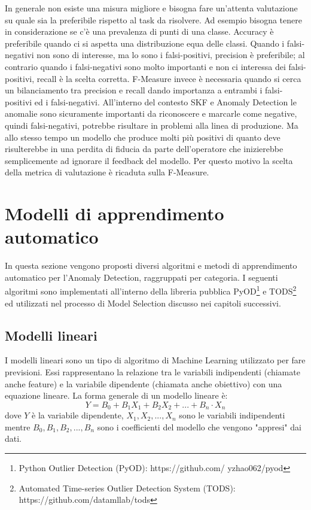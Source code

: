 In generale non esiste una misura migliore e bisogna fare un'attenta valutazione su quale sia la preferibile rispetto al task da risolvere.
Ad esempio bisogna tenere in considerazione se c'è una prevalenza di punti di una classe. Accuracy è preferibile quando ci si aspetta una distribuzione equa delle classi. Quando i falsi-negativi non sono di interesse, ma lo sono i falsi-positivi, precision è preferibile; al contrario quando i falsi-negativi sono molto importanti e non ci interessa dei falsi-positivi, recall è la scelta corretta.
F-Measure invece è necessaria quando si cerca un bilanciamento tra precision e recall dando importanza a entrambi i falsi-positivi ed i falsi-negativi. 
All'interno del contesto SKF e Anomaly Detection le anomalie sono sicuramente importanti da riconoscere e marcarle come negative, quindi falsi-negativi, potrebbe risultare in problemi alla linea di produzione. Ma allo stesso tempo un modello che produce molti più positivi di quanto deve risulterebbe in una perdita di fiducia da parte dell'operatore che inizierebbe semplicemente ad ignorare il feedback del modello. Per questo motivo la scelta della metrica di valutazione è ricaduta sulla F-Measure.



\section{Modelli di apprendimento automatico}
In questa sezione vengono proposti diversi algoritmi e metodi di apprendimento automatico per l'Anomaly Detection, raggruppati per categoria.
I seguenti algoritmi sono implementati all'interno della libreria pubblica PyOD\footnote{Python Outlier Detection (PyOD): https://github.com/
yzhao062/pyod} e TODS\footnote{Automated Time-series Outlier Detection System
 (TODS): https://github.com/datamllab/tods} ed utilizzati nel processo di Model Selection discusso nei capitoli successivi.

\subsection{Modelli lineari}
I modelli lineari sono un tipo di algoritmo di Machine Learning utilizzato per fare previsioni. Essi rappresentano la relazione tra le variabili indipendenti (chiamate anche feature) e la variabile dipendente (chiamata anche obiettivo) con una equazione lineare. La forma generale di un modello lineare è: 
\[ Y = B_0 + B_1X_1 + B_2X_2 + ... + B_n \cdot X_n\]
dove $ Y $ è la variabile dipendente,  \(X_1, X_2, ..., X_n\)  sono le variabili indipendenti mentre \( B_0, B_1, B_2, ..., B_n\) sono i coefficienti del modello che vengono "appresi" dai dati.

